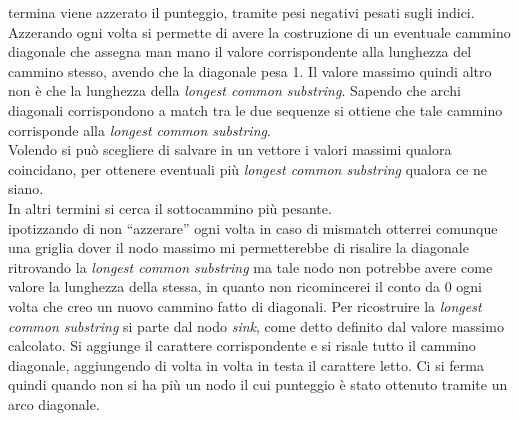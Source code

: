 \documentclass[a4paper,12pt, oneside]{book}
\begin{document}
termina viene azzerato il punteggio, tramite pesi negativi pesati sugli
indici. Azzerando ogni volta si permette di avere la costruzione di un eventuale
cammino diagonale che assegna man mano il valore corrispondente alla lunghezza
del cammino stesso, avendo che la diagonale pesa 1. Il valore massimo quindi
altro non è che  
la lunghezza della \textit{longest common substring}. Sapendo che archi
diagonali corrispondono a match tra le due sequenze si ottiene che tale cammino
corrisponde alla \textit{longest common substring}. \\
Volendo si può scegliere di salvare in un vettore i valori massimi qualora
coincidano, per ottenere eventuali più \textit{longest common substring} qualora
ce ne siano.\\
In altri termini si cerca il sottocammino più pesante.\\
ipotizzando di non ``azzerare'' ogni volta in caso di mismatch otterrei comunque
una griglia dover il nodo massimo mi permetterebbe di risalire la diagonale
ritrovando la \textit{longest common substring} ma tale nodo non potrebbe avere
come valore la lunghezza della stessa, in quanto non ricomincerei il conto da 0
ogni volta che creo un nuovo cammino fatto di diagonali.
Per ricostruire la \textit{longest common substring} si parte dal nodo
\textit{sink}, come detto definito dal valore massimo calcolato. Si aggiunge il
carattere corrispondente e si risale tutto il cammino diagonale, aggiungendo di
volta in volta in testa il carattere letto. Ci si ferma quindi quando non si ha
più un nodo il cui punteggio è stato ottenuto tramite un arco diagonale.
\end{document}
